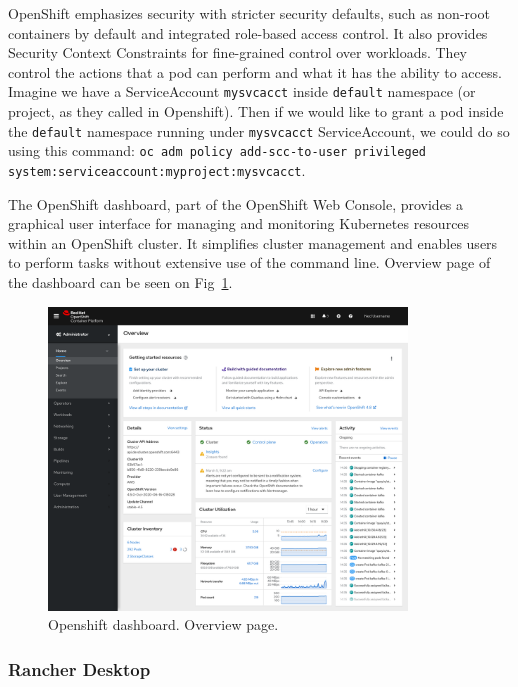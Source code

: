 OpenShift emphasizes security with stricter security defaults, such as non-root containers by default and integrated role-based access control. It also provides Security Context Constraints for fine-grained control over workloads. They control the actions that a pod can perform and what it has the ability to access. Imagine we have a ServiceAccount \lstinline{mysvcacct} inside \lstinline{default} namespace (or project, as they called in Openshift). Then if we would like to grant a pod inside the \lstinline{default} namespace running under \lstinline{mysvcacct} ServiceAccount, we could do so using this command: \lstinline[breaklines=true]|oc adm policy add-scc-to-user privileged system:serviceaccount:myproject:mysvcacct|.

The OpenShift dashboard, part of the OpenShift Web Console, provides a graphical user interface for managing and monitoring Kubernetes resources within an OpenShift cluster. It simplifies cluster management and enables users to perform tasks without extensive use of the command line. Overview page of the dashboard can be seen on Fig~\ref{img:openshift-dashboard}.

\begin{figure}[!hbt]
	\begin{center}
		\includegraphics[width=0.85\textwidth]{images/openshift-dashboard.png}
        \caption{Openshift dashboard. Overview page.}
		\label{img:openshift-dashboard}
	\end{center}
\end{figure}

\subsubsection*{Rancher Desktop}

